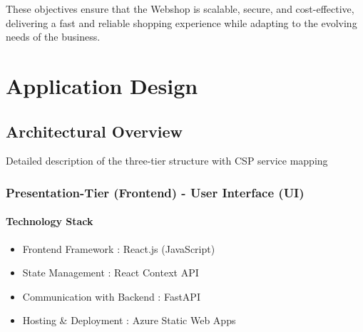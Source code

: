 \documentclass{llncs}
\begin{document}
These objectives ensure that the Webshop is scalable, secure, and cost-effective, delivering a fast and reliable shopping experience while adapting to the evolving needs of the business.

\section{Application Design}
\subsection{Architectural Overview}
Detailed description of the three-tier structure with CSP service mapping
\subsubsection{Presentation-Tier (Frontend) - User Interface (UI)}
\paragraph{Technology Stack}
\begin{itemize}
    \item Frontend Framework : React.js (JavaScript)
    \item State Management : React Context API
    \item Communication with Backend : FastAPI
    \item Hosting \& Deployment : Azure Static Web Apps
 
\end{itemize}
\end{document}

